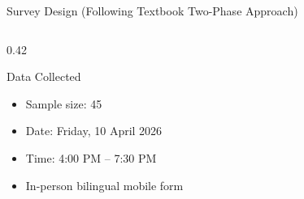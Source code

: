 \documentclass[10pt, aspectratio=169]{beamer}
\begin{document}
\begin{frame}[shrink=5]{Survey Design (Following Textbook Two-Phase Approach)}
\begin{columns}[T]
\begin{column}{0.42\textwidth}
            \vspace{0.2em}
            \begin{block}{Data Collected}
                \small
                \begin{itemize}
                    \item Sample size: 45
                    \item Date: Friday, 10 April 2026
                    \item Time: 4:00 PM -- 7:30 PM
                    \item In-person bilingual mobile form
                \end{itemize}
            \end{block}
        \end{column}
    \end{columns}
\end{frame}
\end{document}
